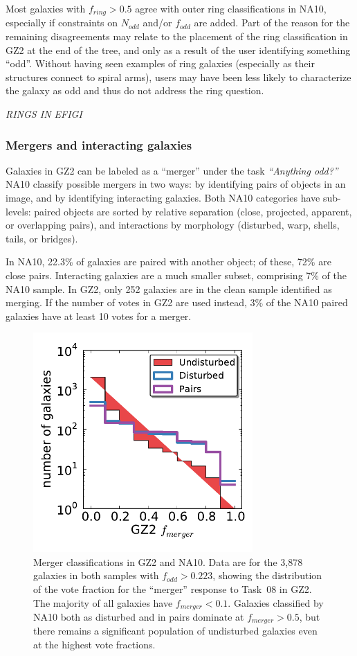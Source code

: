 \documentclass[useAMS,usenatbib]{mn2e}
\begin{document}
Most galaxies with $f_{ring}>0.5$ agree with outer ring classifications in NA10, especially if constraints on $N_{odd}$ and/or $f_{odd}$ are added. Part of the reason for the remaining disagreements may relate to the placement of the ring classification in GZ2 at the end of the tree, and only as a result of the user identifying something ``odd''. Without having seen examples of ring galaxies (especially as their structures connect to spiral arms), users may have been less likely to characterize the galaxy as odd and thus do not address the ring question. 

{\em RINGS IN EFIGI}

\subsubsection{Mergers and interacting galaxies}

Galaxies in GZ2 can be labeled as a ``merger'' under the task {\it ``Anything odd?''} NA10 classify possible mergers in two ways: by identifying pairs of objects in an image, and by identifying interacting galaxies. Both NA10 categories have sub-levels: paired objects are sorted by relative separation (close, projected, apparent, or overlapping pairs), and interactions by morphology (disturbed, warp, shells, tails, or bridges). 

In NA10, 22.3\% of galaxies are paired with another object; of these, 72\% are close pairs. Interacting galaxies are a much smaller subset, comprising 7\% of the NA10 sample. In GZ2, only 252 galaxies are in the clean sample identified as merging. If the number of votes in GZ2 are used instead, 3\% of the NA10 paired galaxies have at least 10 votes for a merger. 

\begin{figure}
\includegraphics[angle=0,width=3.3in]{figures/na_gz2_mergers.pdf}
\caption{Merger classifications in GZ2 and NA10. Data are for the 3,878 galaxies in both samples with $f_{odd}>0.223$, showing the distribution of the vote fraction for the ``merger'' response to Task~08 in GZ2. The majority of all galaxies have $f_{merger}<0.1$. Galaxies classified by NA10 both as disturbed and in pairs dominate at $f_{merger}>0.5$, but there remains a significant population of undisturbed galaxies even at the highest vote fractions.
\label{fig-na_pairs}}
\end{figure}
\end{document}

